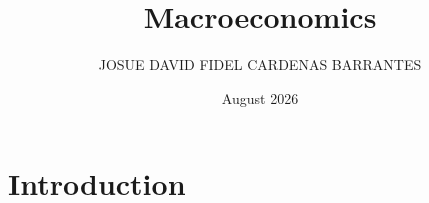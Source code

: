 \documentclass{article}
\title{Macroeconomics}
\author{JOSUE DAVID FIDEL CARDENAS BARRANTES}
\date{August 2026}
\begin{document}
\maketitle

\section{Introduction}
\end{document}
